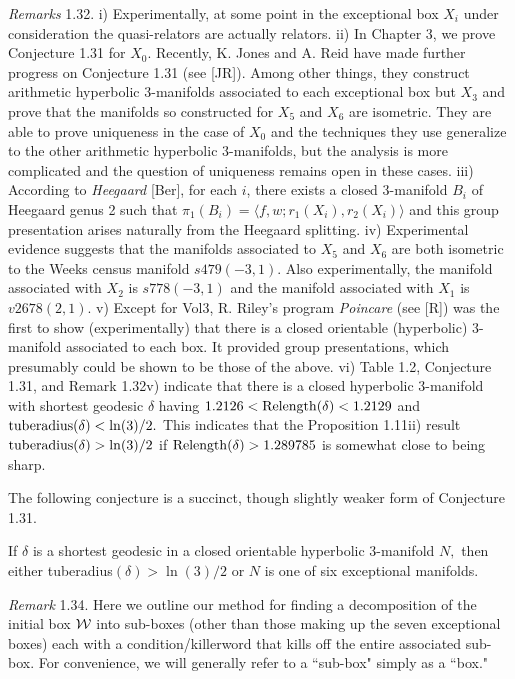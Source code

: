 {\it Remarks} 1.32.  i)
Experimentally, at some point in the exceptional box $X_i$ under consideration the quasi-relators are actually relators. 
ii) In Chapter 3, we prove Conjecture 1.31 for $X_0.$ Recently, K. Jones and A. Reid have made further progress on Conjecture 1.31 (see [JR]).  Among other things, they construct arithmetic hyperbolic $3$-manifolds associated to each exceptional box but $X_3$ and prove that the manifolds so constructed for $X_5$ and $X_6$ are isometric.  They are able to prove uniqueness
in the case of $X_0$ and
the techniques they use generalize to the other arithmetic hyperbolic $3$-manifolds, but the analysis is more complicated and the question of uniqueness remains open in these cases.
iii) According to {\it Heegaard} [Ber], for each $i$, 
there exists a closed $3$-manifold $B_i$ of Heegaard genus 2 such that $\pi_1(B_i)=\langle f,w;r_1(X_i),r_2(X_i)\rangle $ and
this group presentation arises naturally from the Heegaard splitting.
 iv) Experimental evidence suggests that the manifolds associated to $X_5$ and $X_6$ are both 
isometric to the Weeks census manifold $s479(-3,1).$
Also experimentally, the manifold associated with $X_2$ is $s778(-3,1)$ and the manifold associated with $X_1$ is $v2678(2,1).$
v) Except for Vol3, R. Riley's program {\it Poincar{\rm \'{\it e}}}  (see [R]) was the first to show (experimentally) that there is a closed orientable (hyperbolic) 
$3$-manifold associated to each box.  It provided group presentations, which presumably could be shown to be those of the above.
vi)  Table 1.2, Conjecture 1.31, and Remark 1.32v) indicate that 
there is a closed hyperbolic $3$-manifold with shortest geodesic $\delta$
having $1.2126 < {\rm Relength}(\delta) < 1.2129$ and 
${\rm tuberadius}(\delta) < \ln(3)/2.$
This indicates that the 
Proposition 1.11ii) result
${\rm tuberadius}(\delta) > \ln(3)/2$ if ${\rm Relength}(\delta) > 1.289785$
is somewhat close to being sharp.

 The following conjecture is a succinct, though slightly weaker
form of Conjecture 1.31.

  If $\delta$ is a shortest geodesic in a closed
orientable hyperbolic $3$\/{\rm -}\/manifold $N,$ then either 
tuberadius$(\delta) > \ln(3)/2$
or $N$ is one of six exceptional manifolds.\endproclaim

{\it Remark} 1.34.
Here we outline our method for finding a decomposition of the initial box ${\cal W}$ into sub-boxes (other than those making up the
 seven exceptional boxes)
each with a condition/killerword that kills off the entire associated sub-box.
For convenience, we will generally refer to a ``sub-box" simply as a ``box."

